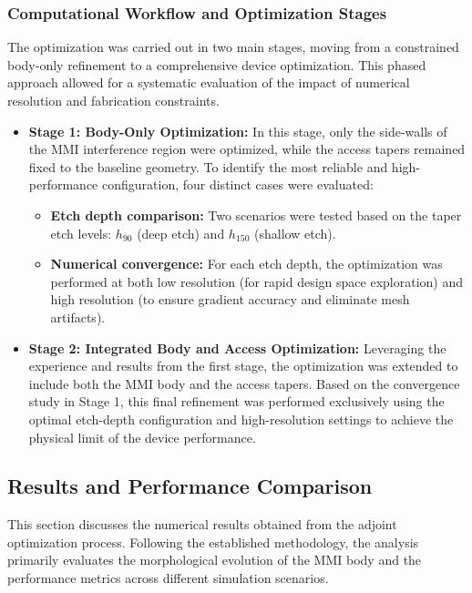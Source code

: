\subsubsection{Computational Workflow and Optimization Stages}

The optimization was carried out in two main stages, moving from a constrained body-only refinement 
to a comprehensive device optimization. This phased approach allowed for a systematic evaluation of 
the impact of numerical resolution and fabrication constraints.

\begin{itemize}
    \item \textbf{Stage 1: Body-Only Optimization:} In this stage, only the side-walls of the MMI 
    interference region were optimized, while the access tapers remained fixed to the baseline 
    geometry. To identify the most reliable and high-performance configuration, four distinct cases 
    were evaluated:
    \begin{itemize}
        \item \textbf{Etch depth comparison:} Two scenarios were tested based on the taper etch 
        levels: $h_{90}$ (deep etch) and $h_{150}$ (shallow etch).
        \item \textbf{Numerical convergence:} For each etch depth, the optimization was performed 
        at both low resolution (for rapid design space exploration) and high resolution (to ensure 
        gradient accuracy and eliminate mesh artifacts).
    \end{itemize}
    
    \item \textbf{Stage 2: Integrated Body and Access Optimization:} Leveraging the experience and 
    results from the first stage, the optimization was extended to include both the MMI body and 
    the access tapers. Based on the convergence study in Stage 1, this final refinement was 
    performed exclusively using the optimal etch-depth configuration and high-resolution settings 
    to achieve the physical limit of the device performance.
\end{itemize}


\subsection{Results and Performance Comparison}\label{sec:ch3-mmi_results}

This section discusses the numerical results obtained from the adjoint optimization process. 
Following the established methodology, the analysis primarily evaluates the morphological evolution 
of the MMI body and the performance metrics across different simulation scenarios.

